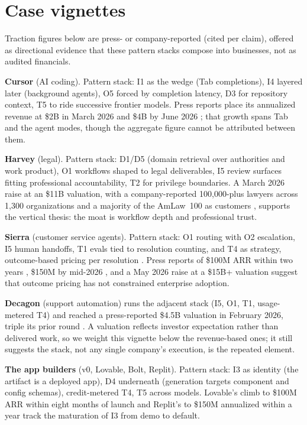 \documentclass[11pt]{article}
\begin{document}
\section{Case vignettes}
\label{sec:vignettes}

Traction figures below are press- or company-reported (cited per claim),
offered as directional evidence that these pattern stacks compose into businesses, not as
audited financials.

\textbf{Cursor} (AI coding). Pattern stack: I1 as the wedge (Tab
completions), I4 layered later (background agents), O5 forced by
completion latency, D3 for repository context, T5 to ride successive frontier
models. Press reports place its annualized revenue at \$2B in March 2026 and
\$4B by June 2026 \citep{techcrunch2026cursor, forbes2026cursor}; that growth
spans Tab and the agent modes, though the aggregate figure cannot be
attributed between them.

\textbf{Harvey} (legal). Pattern stack: D1/D5 (domain retrieval over
authorities and work product), O1 workflows shaped to legal deliverables, I5
review surfaces fitting professional accountability, T2 for privilege
boundaries. A March 2026 raise at an \$11B valuation, with a company-reported
100{,}000-plus lawyers across 1{,}300 organizations and a majority of the
AmLaw~100 as customers \citep{harvey2026raise}, supports the vertical thesis: the moat is
workflow depth and professional trust.

\textbf{Sierra} (customer service agents). Pattern stack: O1 routing with O2
escalation, I5 human handoffs, T1 evals tied to resolution counting, and
T4 as strategy, outcome-based pricing per resolution
\citep{sierra2024outcomes}. Press reports of \$100M ARR within two years
\citep{techcrunch2025sierraarr}, \$150M by mid-2026 \citep{cnbc2026sierra},
and a May 2026 raise at a \$15B+ valuation \citep{techcrunch2026sierra}
suggest that outcome pricing has not constrained enterprise adoption.

\textbf{Decagon} (support automation) runs the adjacent stack (I5, O1, T1,
usage-metered T4) and reached a press-reported \$4.5B valuation in February
2026, triple its prior round \citep{forbes2026decagon}. A valuation reflects
investor expectation rather than delivered work, so we weight this vignette
below the revenue-based ones; it still suggests the stack, not any single
company's execution, is the repeated element.

\textbf{The app builders} (v0, Lovable, Bolt, Replit). Pattern stack: I3 as
identity (the artifact is a deployed app), D4 underneath (generation targets
component and config schemas), credit-metered T4, T5 across models. Lovable's
climb to \$100M ARR within eight months of launch and Replit's to \$150M
annualized within a year \citep{techcrunch2025lovable, techcrunch2025replit}
track the maturation of I3 from demo to default.
\end{document}
